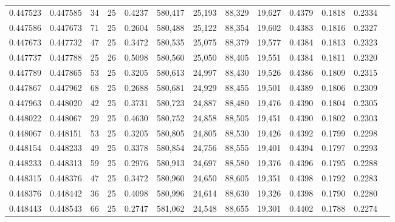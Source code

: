 \begin{tabular}{rrrrrrrrrrrrr}
0.447523 & 0.447585 &    34 &  25 &                                     0.4237 & 580,417 &  25,193 &  88,329 &  19,627 & 0.4379 & 0.1818 & 0.2334 \\
0.447586 & 0.447673 &    71 &  25 &                                     0.2604 & 580,488 &  25,122 &  88,354 &  19,602 & 0.4383 & 0.1816 & 0.2327 \\
0.447673 & 0.447732 &    47 &  25 &                                     0.3472 & 580,535 &  25,075 &  88,379 &  19,577 & 0.4384 & 0.1813 & 0.2323 \\
0.447737 & 0.447788 &    25 &  26 &                                     0.5098 & 580,560 &  25,050 &  88,405 &  19,551 & 0.4384 & 0.1811 & 0.2320 \\
0.447789 & 0.447865 &    53 &  25 &                                     0.3205 & 580,613 &  24,997 &  88,430 &  19,526 & 0.4386 & 0.1809 & 0.2315 \\
0.447867 & 0.447962 &    68 &  25 &                                     0.2688 & 580,681 &  24,929 &  88,455 &  19,501 & 0.4389 & 0.1806 & 0.2309 \\
0.447963 & 0.448020 &    42 &  25 &                                     0.3731 & 580,723 &  24,887 &  88,480 &  19,476 & 0.4390 & 0.1804 & 0.2305 \\
0.448022 & 0.448067 &    29 &  25 &                                     0.4630 & 580,752 &  24,858 &  88,505 &  19,451 & 0.4390 & 0.1802 & 0.2303 \\
0.448067 & 0.448151 &    53 &  25 &                                     0.3205 & 580,805 &  24,805 &  88,530 &  19,426 & 0.4392 & 0.1799 & 0.2298 \\
0.448154 & 0.448233 &    49 &  25 &                                     0.3378 & 580,854 &  24,756 &  88,555 &  19,401 & 0.4394 & 0.1797 & 0.2293 \\
0.448233 & 0.448313 &    59 &  25 &                                     0.2976 & 580,913 &  24,697 &  88,580 &  19,376 & 0.4396 & 0.1795 & 0.2288 \\
0.448315 & 0.448376 &    47 &  25 &                                     0.3472 & 580,960 &  24,650 &  88,605 &  19,351 & 0.4398 & 0.1792 & 0.2283 \\
0.448376 & 0.448442 &    36 &  25 &                                     0.4098 & 580,996 &  24,614 &  88,630 &  19,326 & 0.4398 & 0.1790 & 0.2280 \\
0.448443 & 0.448543 &    66 &  25 &                                     0.2747 & 581,062 &  24,548 &  88,655 &  19,301 & 0.4402 & 0.1788 & 0.2274 \\

\end{tabular}
